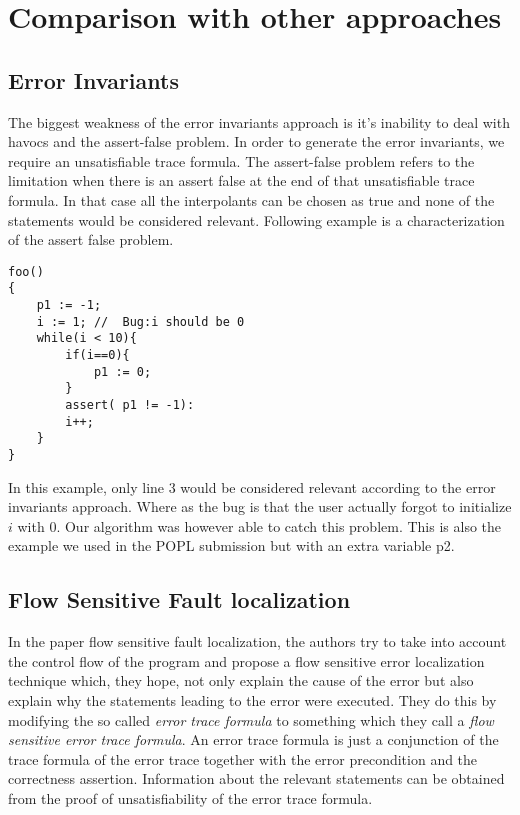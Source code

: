 \documentclass{article}
\begin{document}
\section{Comparison with other approaches}
\subsection{Error Invariants}
The biggest weakness of the error invariants approach \cite{errorinvariants} is it's inability to deal with havocs and the assert-false problem. In order to generate the error invariants, we require an unsatisfiable trace formula.  The assert-false problem refers to the limitation when there is an assert false at the end of that unsatisfiable trace formula. In that case all the interpolants can be chosen as true and none of the statements would be considered relevant. Following example is a characterization of the assert false problem.
\begin{lstlisting}
foo()
{ 
	p1 := -1;
	i := 1; //  Bug:i should be 0
	while(i < 10){
		if(i==0){
			p1 := 0;		
		}
		assert( p1 != -1):
		i++;	
	}
}
\end{lstlisting}
In this example, only line 3 would be considered relevant according to the error invariants approach. Where as the bug is that the user actually forgot to initialize $i$ with 0. Our algorithm was however able to catch this problem. This is also the example we used in the POPL submission but with an extra variable p2.

\subsection{Flow Sensitive Fault localization} 
In the paper flow sensitive fault localization\cite{faultlocalization}, the authors try to take into account the control flow of the program and propose a flow sensitive error localization technique which, they hope, not only explain the cause of the error but also explain why the statements leading to the error were executed. They do this by modifying the so called \textit{error trace formula} to something which they call a \textit{flow sensitive error trace formula}. An error trace formula is just a conjunction of the trace formula of the error trace together with the error precondition and the correctness assertion. Information about the relevant statements can be obtained from the proof of unsatisfiability of the error trace formula.
\end{document}
